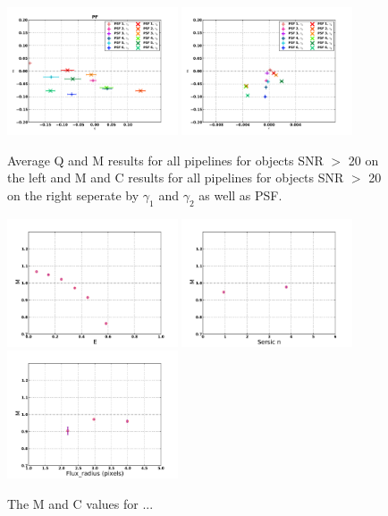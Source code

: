 \begin{figure}
\centering
\includegraphics[width=0.45\textwidth]{fig/QMC_main_PF_f.pdf} 
\includegraphics[width=0.45\textwidth]{fig/MC_main_PF_f.pdf} 
\caption{Average Q and M results for all pipelines for objects 
SNR $>$ 20 on the left and M and C results for all pipelines for objects 
SNR $>$ 20 on the right seperate by $\gamma_{1} $ and $\gamma_{2} $ as
well as PSF.}
\label{fig:PFDNT_qmc}
\end{figure}
\begin{figure}
\centering
\includegraphics[width=0.45\textwidth]{fig/MvalePF.pdf} 
\includegraphics[width=0.45\textwidth]{fig/Mval_typePF.pdf} 
\includegraphics[width=0.45\textwidth]{fig/Mval_sizePF.pdf} 
\caption{The M and C values for ...}
\label{fig:DEIMOS_m}
\end{figure}

\clearpage